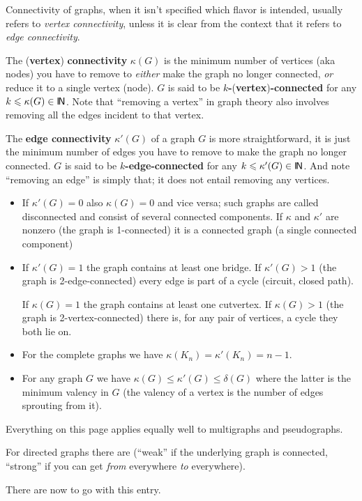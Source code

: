 \documentclass[12pt]{article}
\let\le\leqslant
\let\S\scriptstyle
\let\SS\scriptscriptstyle
\def\sfmath#1{{\mathchoice%
{{\sf #1}}{{\sf #1}}{{\S\sf #1}}{{\SS\sf #1}}}}
\def\Stalkset#1{\sfmath{I\kern-.12em#1}}
\def\Nset{\Stalkset N}
\begin{document}

Connectivity of graphs, when it isn't specified which flavor is intended, usually refers to {\em vertex connectivity\/}, unless it is clear from the context that it refers to {\em edge connectivity\/}.

The ({\bf vertex}) {\bf connectivity} $\kappa(G)$ is the minimum number of vertices (aka nodes) you have to remove to {\em either\/} make the graph no longer connected, {\em or\/} reduce it to a single vertex (node). $G$ is said to be {\bf $k$-}({\bf vertex}){\bf-connected} for any $k\le\kappa(G)\in\Nset$. Note that ``removing a vertex'' in graph theory also involves removing all the edges incident to that vertex.

The {\bf edge connectivity} $\kappa'(G)$ of a graph $G$ is more straightforward, it is just the minimum number of edges you have to remove to make the graph no longer connected. $G$ is said to be {\bf $k$-edge-connected} for any $k\le\kappa'(G)\in\Nset$. And note ``removing an edge'' is simply that; it does not entail removing any vertices.

\begin{itemize}

\item If $\kappa'(G)=0$ also $\kappa(G)=0$ and vice versa; such graphs are
      called disconnected and consist of several connected components.
      If $\kappa$ and $\kappa'$ are nonzero (the graph is 1-connected) it is
      a connected graph (a single connected component)

\item If $\kappa'(G)=1$ the graph contains at least one bridge. If 
      $\kappa'(G)\gt1$ (the graph is 2-edge-connected) every edge is 
      part of a cycle (circuit, closed path).

      If $\kappa(G)=1$ the graph contains at least one cutvertex. If 
      $\kappa(G)\gt1$ (the graph is 2-vertex-connected) there is, for 
      any pair of vertices, a cycle they both lie on.

\item For the complete graphs we have $\kappa(K_n)=\kappa'(K_n)=n-1$.

\item For any graph $G$ we have $\kappa(G) \le \kappa'(G) \le \delta(G)$
      where the latter is the minimum valency in $G$ (the valency of a
      vertex is the number of edges sprouting from it).

\end{itemize}

Everything on this page applies equally well to multigraphs and pseudographs.

For directed graphs there are 
 (``weak'' if the underlying graph is connected, ``strong'' if you can get {\em from\/} everywhere {\em to\/} everywhere).

There are now
 to go with this entry.
\end{document}
